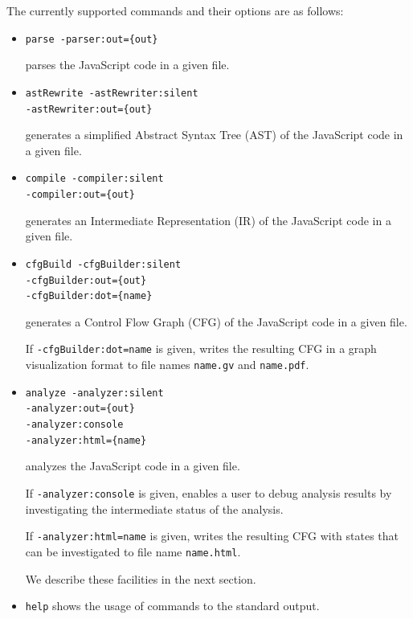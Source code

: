 The currently supported commands and their options are as follows:
\begin{itemize}
\item \verb!parse -parser:out={out}!

parses the JavaScript code in a given file.
\item \verb!astRewrite -astRewriter:silent!\\
\hspace*{5.8em}\verb!-astRewriter:out={out}!

generates a simplified Abstract Syntax Tree (AST)
of the  JavaScript code in a given file.
\item \verb!compile -compiler:silent!\\
\hspace*{4.2em}\verb!-compiler:out={out}!

generates an Intermediate Representation (IR)
of the  JavaScript code in a given file.
\item \verb!cfgBuild -cfgBuilder:silent!\\
\hspace*{4.8em}\verb!-cfgBuilder:out={out}!\\
\hspace*{4.8em}\verb!-cfgBuilder:dot={name}!

generates a Control Flow Graph (CFG) of the  JavaScript code in a given file.

If \verb!-cfgBuilder:dot=name! is given,
\safe writes the resulting CFG in a graph visualization format
to file names \verb!name.gv! and \verb!name.pdf!.

\item \verb!analyze -analyzer:silent!\\
\hspace*{4.4em}\verb!-analyzer:out={out}!\\
\hspace*{4.4em}\verb!-analyzer:console!\\
\hspace*{4.4em}\verb!-analyzer:html={name}!

analyzes the  JavaScript code in a given file.

If \verb!-analyzer:console! is given,
\safe enables a user to debug analysis results by investigating the intermediate
status of the analysis.

If \verb!-analyzer:html=name! is given,
\safe writes the resulting CFG with states that can be investigated to
file name \verb!name.html!.

We describe these facilities in the next section.

\item \verb!help! shows the usage of \safe commands to the standard output.
\end{itemize}

